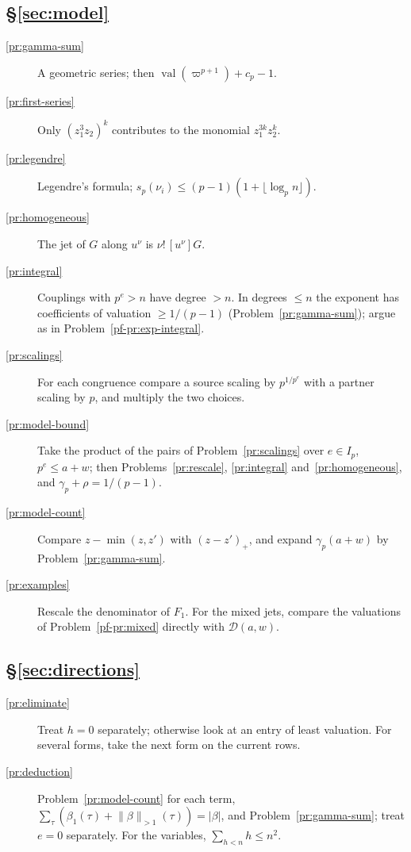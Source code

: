 \documentclass[reqno]{amsart}
\theoremstyle{plain}
\theoremstyle{definition}
\theoremstyle{remark}
\newcommand{\val}{\operatorname{val}}
\newcommand{\Dc}{\mathcal{D}}
\newcommand{\nb}[1]{\lVert #1 \rVert}
\begin{document}
\subsection*{\S\ref{sec:model}}
\begin{description}
\item[\ref{pr:gamma-sum}] A geometric series; then \(\val(\varpi^{p+1}) + c_p - 1\).
\item[\ref{pr:first-series}] Only \((z_1^3 z_2)^k\) contributes to the monomial \(z_1^{3k} z_2^k\).
\item[\ref{pr:legendre}] Legendre's formula; \(s_p(\nu_i) \le (p-1)(1 + \lfloor \log_p n \rfloor)\).
\item[\ref{pr:homogeneous}] The jet of \(G\) along \(u^\nu\) is \(\nu!\,[u^\nu]G\).
\item[\ref{pr:integral}] Couplings with \(p^e > n\) have degree \(> n\).  In degrees \(\le n\) the exponent has coefficients of valuation \(\ge 1/(p-1)\) (Problem~\ref{pr:gamma-sum}); argue as in Problem~\ref{pf-pr:exp-integral}.
\item[\ref{pr:scalings}] For each congruence compare a source scaling by \(p^{1/p^e}\) with a partner scaling by \(p\), and multiply the two choices.
\item[\ref{pr:model-bound}] Take the product of the pairs of Problem~\ref{pr:scalings} over \(e \in I_p\), \(p^e \le a + w\); then Problems~\ref{pr:rescale}, \ref{pr:integral} and~\ref{pr:homogeneous}, and \(\gamma_p + \rho = 1/(p-1)\).
\item[\ref{pr:model-count}] Compare \(z - \min(z, z')\) with \((z - z')_+\), and expand \(\gamma_p(a+w)\) by Problem~\ref{pr:gamma-sum}.
\item[\ref{pr:examples}] Rescale the denominator of \(F_1\).  For the mixed jets, compare the valuations of Problem~\ref{pf-pr:mixed} directly with \(\Dc(a,w)\).
\end{description}

\subsection*{\S\ref{sec:directions}}
\begin{description}
\item[\ref{pr:eliminate}] Treat \(h = 0\) separately; otherwise look at an entry of least valuation.  For several forms, take the next form on the current rows.
\item[\ref{pr:deduction}] Problem~\ref{pr:model-count} for each term, \(\sum_\tau (\beta_1(\tau) + \nb{\beta}_{>1}(\tau)) = \lvert\beta\rvert\), and Problem~\ref{pr:gamma-sum}; treat \(e = 0\) separately.  For the variables, \(\sum_{h < n} h \le n^2\).
\end{description}
\end{document}
